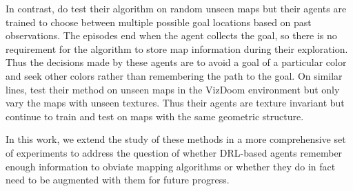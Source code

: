 In contrast, \cite{OhChSiICML2016} do test their algorithm on random unseen maps but their agents are trained to choose between multiple possible goal locations based on past observations.
The episodes end when the agent collects the goal, so there is no requirement for the algorithm to store map information during their exploration.
Thus the decisions made by these agents are to avoid a goal of a particular color and seek other colors rather than remembering the path to the goal.
On similar lines, \cite{ChLaSaNIPS2016} test their method on unseen maps in the VizDoom environment but only vary the maps with unseen textures. Thus their agents are texture invariant but continue to train and test on maps with the same geometric structure.
%

In this work, we extend the study of these methods in a more comprehensive set of experiments to address the question of whether DRL-based agents remember enough information to obviate mapping algorithms or whether they do in fact need to be augmented with them for future progress.
 
